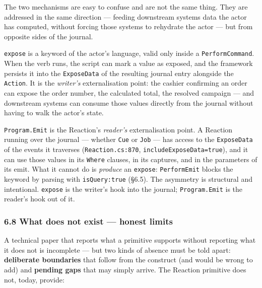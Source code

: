 \documentclass[
]{article}
\let\origtexttt\texttt%
\renewcommand{\texttt}[1]{\origtexttt{\seqsplit{#1}}}%
\let\texttt\origtexttt%
\begin{document}
The two mechanisms are easy to confuse and are not the same thing. They
are addressed in the same direction --- feeding downstream systems data
the actor has computed, without forcing those systems to rehydrate the
actor --- but from opposite sides of the journal.

\texttt{expose} is a keyword of the actor's language, valid only inside
a \texttt{PerformCommand}. When the verb runs, the script can mark a
value as exposed, and the framework persists it into the
\texttt{ExposeData} of the resulting journal entry alongside the
\texttt{Action}. It is the \emph{writer's} externalisation point: the
cashier confirming an order can expose the order number, the calculated
total, the resolved campaign --- and downstream systems can consume
those values directly from the journal without having to walk the
actor's state.

\texttt{Program.Emit} is the Reaction's \emph{reader's} externalisation
point. A Reaction running over the journal --- whether \texttt{Cue} or
\texttt{Job} --- has access to the \texttt{ExposeData} of the events it
traverses (\texttt{Reaction.cs:870}, \texttt{includeExposeData=true}),
and it can use those values in its \texttt{Where} clauses, in its
captures, and in the parameters of its emit. What it cannot do is
\emph{produce} an \texttt{expose}: \texttt{PerformEmit} blocks the
keyword by parsing with \texttt{isQuery:true} (§6.5). The asymmetry is
structural and intentional. \texttt{expose} is the writer's hook into
the journal; \texttt{Program.Emit} is the reader's hook out of it.

\subsubsection{6.8 What does not exist --- honest
limits}\label{what-does-not-exist-honest-limits}

A technical paper that reports what a primitive supports without
reporting what it does not is incomplete --- but two kinds of absence
must be told apart: \textbf{deliberate boundaries} that follow from the
construct (and would be wrong to add) and \textbf{pending gaps} that may
simply arrive. The Reaction primitive does not, today, provide:
\end{document}
